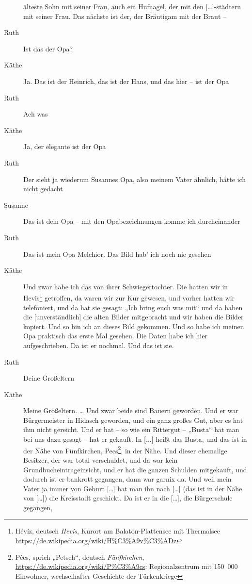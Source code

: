 \documentclass[ngerman,]{article}
\begin{document}
\begin{multicols}{3}
\begin{description}
älteste Sohn mit seiner Frau, auch ein Hufnagel, der mit den
{[}\ldots{}{]}-städtern mit seiner Frau. Das nächste ist der, der
Bräutigam mit der Braut –
\item[Ruth]
Ist das der Opa?
\item[Käthe]
Ja. Das ist der Heinrich, das ist der Hans, und das hier – ist der Opa
\item[Ruth]
Ach was
\item[Käthe]
Ja, der elegante ist der Opa
\item[Ruth]
Der sieht ja wiederum Susannes Opa, also meinem Vater ähnlich, hätte ich
nicht gedacht
\item[Susanne]
Das ist dein Opa – mit den Opabezeichnungen komme ich durcheinander
\item[Ruth]
Das ist mein Opa Melchior. Das Bild hab' ich noch nie gesehen
\item[Käthe]
Und zwar habe ich das von ihrer Schwiegertochter. Die hatten wir in
Hevis\footnote{Hévíz, deutsch \emph{Hevis}, Kurort am Balaton-Plattensee
  mit Thermalsee \url{https://de.wikipedia.org/wiki/H\%C3\%A9v\%C3\%ADz}}
getroffen, da waren wir zur Kur gewesen, und vorher hatten wir
telefoniert, und da hat sie gesagt: „Ich bring euch was mit“ und da
haben die {[}unverständlich{]} die alten Bilder mitgebracht und wir
haben die Bilder kopiert. Und so bin ich an dieses Bild gekommen. Und so
habe ich meinen Opa praktisch das erste Mal gesehen. Die Daten habe ich
hier aufgeschrieben. Da ist er nochmal. Und das ist sie.
\item[Ruth]
Deine Großeltern
\item[Käthe]
Meine Großeltern. \ldots{} Und zwar beide sind Bauern geworden. Und er
war Bürgermeister in Hidasch geworden, und ein ganz großes Gut, aber es
hat ihm nicht gereicht. Und er hat – so wie ein Rittergut – „Busta“ hat
man bei uns dazu gesagt – hat er gekauft. In {[}...{]} heißt das Busta,
und das ist in der Nähe von Fünfkirchen, Pecs\footnote{Pécs, sprich
  „Petsch“, deutsch \emph{Fünfkirchen},
  \url{https://de.wikipedia.org/wiki/P\%C3\%A9cs}: Regionalzentrum mit
  150~000 Einwohner, wechselhafter Geschichte der Türkenkriege}, in der
Nähe. Und dieser ehemalige Besitzer, der war total verschuldet, und da
war kein Grundbucheintrageinsicht, und er hat die ganzen Schulden
mitgekauft, und dadurch ist er bankrott gegangen, dann war garnix da.
Und weil mein Vater ja immer von Geburt {[}\ldots{}{]} hat man ihn nach
{[}\ldots{}{]} (das ist in der Nähe von {[}\ldots{}{]}) die Kreisstadt
geschickt. Da ist er in die {[}\ldots{}{]}, die Bürgerschule gegangen,

\end{description}
\end{multicols}
\end{document}
